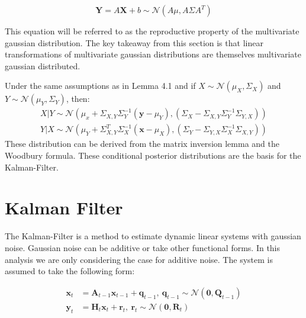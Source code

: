\documentclass[
]{article}
\begin{document}
\[
\begin{equation*}
    \textbf{Y} = A\textbf{X} + b \sim \mathcal{N}(A\mu, A\Sigma A^T)
\end{equation*}
\]

This equation will be referred to as the reproductive property of the
multivariate gaussian distribution. The key takeaway from this section
is that linear transformations of multivariate gaussian distributions
are themselves multivariate gaussian distributed.

Under the same assumptions as in Lemma 4.1 and if
\(X \sim \mathcal{N}(\mu_X, \Sigma_X)\) and
\(Y \sim \mathcal{N}(\mu_Y, \Sigma_Y)\), then: \[
\begin{equation*} 
    \begin{aligned} 
        X|Y \sim \mathcal{N}(\mu_x + \Sigma_{X,Y}\Sigma_Y^{-1}(\textbf{y}-\mu_Y), (\Sigma_X - \Sigma_{X,Y}\Sigma_Y^{-1}\Sigma_{Y,X})) \\
        Y|X \sim \mathcal{N}(\mu_Y + \Sigma_{X,Y}^T\Sigma_X^{-1}(\textbf{x}-\mu_X), (\Sigma_Y - \Sigma_{Y,X}\Sigma_X^{-1}\Sigma_{X,Y})) 
    \end{aligned}
\end{equation*}
\] These distribution can be derived from the matrix inversion lemma and
the Woodbury formula. These conditional posterior distributions are the
basis for the Kalman-Filter.

\hypertarget{kalman-filter}{%
\section{Kalman Filter}\label{kalman-filter}}

The Kalman-Filter is a method to estimate dynamic linear systems with
gaussian noise. Gaussian noise can be additive or take other functional
forms. In this analysis we are only considering the case for additive
noise. The system is assumed to take the following form:

\[
\begin{equation*} 
    \begin{aligned}
        \textbf{x}_t &= \textbf{A}_{t-1} \textbf{x}_{t-1} + \textbf{q}_{t-1},\ \textbf{q}_{t-1} \sim \mathcal{N}(\textbf{0},\textbf{Q}_{t-1}) \\
        \textbf{y}_t &= \textbf{H}_t\textbf{x}_t + \textbf{r}_t, \ \textbf{r}_t \sim \mathcal{N}(\textbf{0},\textbf{R}_{t})          
    \end{aligned}
\end{equation*}
\]
\end{document}
